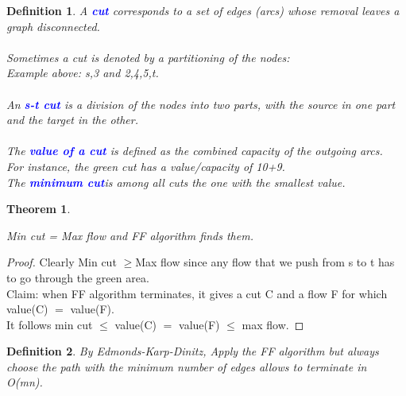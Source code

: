 \documentclass[10pt]{report}
\numberwithin{dummy}{section}
\theoremstyle{ocrenumbox}
\newtheorem{definitionTTT}{Theorem}[]
\theoremstyle{grayman}
\newtheorem{definitionTTTT}{Definition}[]
\newenvironment{thm}{\begin{tBox}\begin{definitionTTT}}{\end{definitionTTT}\end{tBox}}
\newenvironment{voc}{\begin{vBox}\begin{definitionTTTT}}{\end{definitionTTTT}\end{vBox}}
\begin{document}
\begin{voc}
A \textbf{\textcolor{blue}{cut}} corresponds to a set of edges (arcs) whose removal leaves a graph disconnected.\\ \\
Sometimes a cut is denoted by a partitioning of the nodes:\\
Example above: {s,3} and {2,4,5,t}.\\ \\
An \textbf{\textcolor{blue}{s-t cut}} is a division of the nodes into two parts, with the source in one part
and the target in the other.\\  \\
The \textbf{\textcolor{blue}{value of a cut}} is defined as the combined capacity of the outgoing arcs.\\
For instance, the green cut has a value/capacity of 10+9.\\
The \textbf{\textcolor{blue}{minimum cut}}is among all cuts the one with the smallest value.
\end{voc}
\begin{thm}
    \begin{center}
        Min cut = Max flow  and FF algorithm finds them.
    \end{center}
\end{thm}
\begin{proof}
    Clearly Min cut $\ge $Max flow since any flow that we push from s to t has to go through the green area.\\
Claim: when FF algorithm terminates, it gives a cut C and a flow F for which value(C) $=$ value(F).\\
It follows min cut $\leq$ value(C) $=$ value(F) $\leq$ max flow.
\end{proof}

\begin{voc}
    By Edmonds-Karp-Dinitz,
    Apply the FF algorithm but always choose the path with the
    minimum number of edges allows to terminate in O(mn).
\end{voc}
\end{document}

